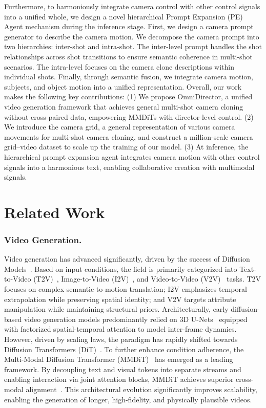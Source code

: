 \documentclass[letterpaper]{article} %
\begin{document}
Furthermore, to harmoniously integrate camera control with other control signals into a unified whole, we design a novel hierarchical Prompt Expansion (PE) Agent mechanism during the inference stage. First, we design a camera prompt generator to describe the camera motion. We decompose the camera prompt into two hierarchies: inter-shot and intra-shot. The inter-level prompt handles the shot relationships across shot transitions to ensure semantic coherence in multi-shot scenarios. The intra-level focuses on the camera clone descriptions within individual shots. Finally, through semantic fusion, we integrate camera motion, subjects, and object motion into a unified representation.
Overall, our work makes the following key contributions: 
(1) We propose OmniDirector, a unified video generation framework that achieves general multi-shot camera cloning without cross-paired data, empowering MMDiTs with director-level control.
(2) We introduce the camera grid, a general representation of various camera movements for multi-shot camera cloning, and construct a million-scale camera grid–video dataset to scale up the training of our model.
(3) At inference, the hierarchical prompt expansion agent integrates camera motion with other control signals into a harmonious text, enabling collaborative creation with multimodal signals.
\vspace{-0.5cm}
\section{Related Work}
\subsubsection{Video Generation.} Video generation has advanced significantly, driven by the success of Diffusion Models~\cite{ho2020denoising, ho2022video, ho2022imagen}. Based on input conditions, the field is primarily categorized into Text-to-Video (T2V)~\cite{singer2022make, villegas2023phenaki, bar2024lumiere, polyak2024movie}, Image-to-Video (I2V)~\cite{zhang2023i2vgen, xing2024dynamicrafter, chen2023seine, renconsisti2v}, and Video-to-Video (V2V)~\cite{wang2023videocomposer} tasks. T2V focuses on complex semantic-to-motion translation; I2V emphasizes temporal extrapolation while preserving spatial identity; and V2V targets attribute manipulation while maintaining structural priors.
Architecturally, early diffusion-based video generation models predominantly relied on 3D U-Nets~\cite{ho2022video, ho2022imagen, singer2022make, blattmann2023stable} equipped with factorized spatial-temporal attention to model inter-frame dynamics. However, driven by scaling laws, the paradigm has rapidly shifted towards Diffusion Transformers (DiT)~\cite{peebles2023scalable, malatte}. To further enhance condition adherence, the Multi-Modal Diffusion Transformer (MMDiT)~\cite{esser2024scaling} has emerged as a leading framework. By decoupling text and visual tokens into separate streams and enabling interaction via joint attention blocks, MMDiT achieves superior cross-modal alignment~\cite{polyak2024movie}. This architectural evolution significantly improves scalability, enabling the generation of longer, high-fidelity, and physically plausible videos. 
\end{document}
